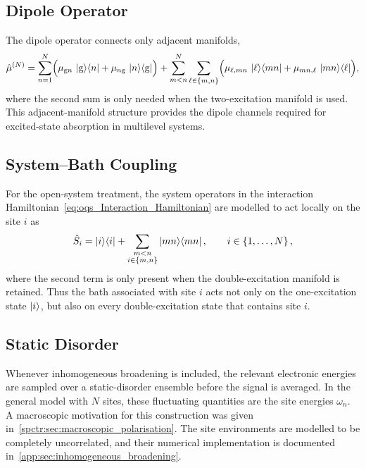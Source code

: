 \subsection{Dipole Operator}

The dipole operator connects only adjacent manifolds,
\begin{equation*}
\hat{\mu}^{(N)}
=
\sum_{n=1}^{N}
\Bigl(
\mu_{\mathrm{g}n}\,\ket{\mathrm{g}}\!\bra{n}
+
\mu_{n\mathrm{g}}\,\ket{n}\!\bra{\mathrm{g}}
\Bigr)
+
\sum_{m<n}^{N}\sum_{\ell\in\{m,n\}}
\Bigl(
\mu_{\ell,mn}\,\ket{\ell}\!\bra{mn}
+
\mu_{mn,\ell}\,\ket{mn}\!\bra{\ell}
\Bigr),
\end{equation*}
where the second sum is only needed when the two-excitation manifold is
used. This adjacent-manifold structure provides the dipole channels required
for excited-state absorption in multilevel systems.

\subsection{System--Bath Coupling}

For the open-system treatment, the system operators in the
interaction Hamiltonian~\autoref{eq:oqs_Interaction_Hamiltonian} are modelled to
act locally on the site \(i\) as
\begin{equation*}
\hat{S}_{i}
=
\ket{i}\!\bra{i}
+
\sum_{\substack{m<n\\ i\in\{m,n\}}}\ket{mn}\!\bra{mn},
\qquad i\in\{1,\dots,N\}\,,
\end{equation*}
where the second term is only present when the double-excitation manifold is
retained. Thus the bath associated with site \(i\) acts not only on the
one-excitation state \(\ket{i}\), but also on every double-excitation state
that contains site \(i\).

\subsection{Static Disorder}

Whenever inhomogeneous broadening is included, the relevant electronic energies
are sampled over a static-disorder ensemble before the signal is averaged. In the general model with \(N\) sites, these fluctuating quantities are the site energies \(\omega_n\). A macroscopic motivation for this construction was given in~\autoref{spctr:sec:macroscopic_polarisation}.
The site environments are modelled to be completely uncorrelated, and their
numerical implementation is documented
in~\autoref{app:sec:inhomogeneous_broadening}.

